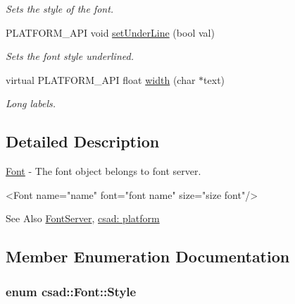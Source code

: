 \begin{DoxyCompactItemize}
\begin{DoxyCompactList}\small\item\em Sets the style of the font. \end{DoxyCompactList}\item 
\hypertarget{classcsad_1_1_font_a5bf4543b059c48b60c4c9b18afe6d7ca}{P\-L\-A\-T\-F\-O\-R\-M\-\_\-\-A\-P\-I void \hyperlink{classcsad_1_1_font_a5bf4543b059c48b60c4c9b18afe6d7ca}{set\-Under\-Line} (bool val)}\label{classcsad_1_1_font_a5bf4543b059c48b60c4c9b18afe6d7ca}

\begin{DoxyCompactList}\small\item\em Sets the font style underlined. \end{DoxyCompactList}\item 
\hypertarget{classcsad_1_1_font_aef48acccbb1dbf8c0334107293840b10}{virtual P\-L\-A\-T\-F\-O\-R\-M\-\_\-\-A\-P\-I float \hyperlink{classcsad_1_1_font_aef48acccbb1dbf8c0334107293840b10}{width} (char $\ast$text)}\label{classcsad_1_1_font_aef48acccbb1dbf8c0334107293840b10}

\begin{DoxyCompactList}\small\item\em Long labels. \end{DoxyCompactList}\end{DoxyCompactItemize}


\subsection{Detailed Description}
\hyperlink{classcsad_1_1_font}{Font} -\/ The font object belongs to font server. 

\begin{DoxyVerb}  <Font name="name" font="font name" size="size font"/>
\end{DoxyVerb}
 \begin{DoxySeeAlso}{See Also}
\hyperlink{classcsad_1_1_font_server}{Font\-Server}, \hyperlink{group__platform}{csad\-: platform} 
\end{DoxySeeAlso}


\subsection{Member Enumeration Documentation}
\hypertarget{classcsad_1_1_font_ae188d2f78967da23f4480c8c97ec7278}{
\subsubsection[{Style}]{\setlength{\rightskip}{0pt plus 5cm}enum {\bf csad\-::\-Font\-::\-Style}}}\label{classcsad_1_1_font_ae188d2f78967da23f4480c8c97ec7278}


